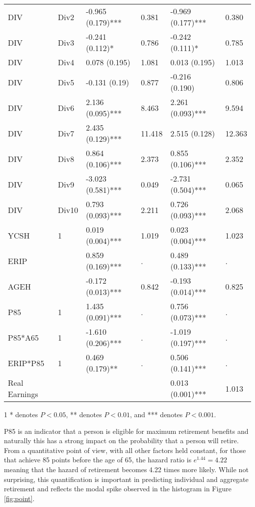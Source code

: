 \documentclass[12pt,letterpaper]{article}
\begin{document}
\begin{table}[htbp]
\begin{threeparttable}
\begin{tabular}{llL{2.5cm}L{1.5cm}L{2.5cm}L{1.5cm}}
			DIV & Div2  & -0.965 (0.179)*** & 0.381 & -0.969 (0.177)*** & 0.380 \\
			DIV & Div3  & -0.241 (0.112)* & 0.786 & -0.242 (0.111)* & 0.785 \\
			DIV & Div4  & 0.078 (0.195) & 1.081 & 0.013 (0.195) & 1.013 \\
			DIV & Div5  & -0.131 (0.19) & 0.877 & -0.216 (0.190) & 0.806 \\
			DIV & Div6  & 2.136 (0.095)*** & 8.463 & 2.261 (0.093)*** & 9.594 \\
			DIV & Div7  & 2.435 (0.129)*** & 11.418 & 2.515 (0.128) & 12.363 \\
			DIV & Div8  & 0.864 (0.106)*** & 2.373 & 0.855 (0.106)*** & 2.352 \\
			DIV & Div9  & -3.023 (0.581)*** & 0.049 & -2.731 (0.504)*** & 0.065 \\
			DIV & Div10 & 0.793 (0.093)*** & 2.211 & 0.726 (0.093)*** & 2.068 \\
			YCSH  & 1     & 0.019 (0.004)*** & 1.019 & 0.023 (0.004)*** & 1.023 \\
			ERIP  &       & 0.859 (0.169)*** & .     & 0.489 (0.133)*** & . \\
			AGEH  &       & -0.172 (0.013)*** & 0.842 & -0.193 (0.014)*** & 0.825 \\
			P85   & 1     & 1.435 (0.091)*** & .     & 0.756 (0.073)*** & . \\
			P85*A65 & 1     & -1.610 (0.206)*** & .     & -1.019 (0.197)*** & . \\
			ERIP*P85 & 1     & 0.469 (0.179)** & .     & 0.506 (0.141)*** & . \\
			Real Earnings &       &       &       & 0.013 (0.001)*** & 1.013 \\
			\bottomrule
		\end{tabular}%
		\begin{tablenotes}
			\item[1] * denotes $P<0.05$, ** denotes $P<0.01$, and *** denotes $P<0.001$.
		\end{tablenotes}
	\end{threeparttable}
	\label{tab:paraest.}%
\end{table}%
P85 is an indicator that a person is eligible for maximum retirement benefits and naturally this has a strong impact on the probability that a person will retire.  From a quantitative point of view, with all other factors held constant, for those that achieve 85 points before the age of 65, the hazard ratio is $e^{1.44} = 4.22$ meaning that the hazard of retirement becomes 4.22 times more likely.  While not surprising, this quantification is important in predicting individual and aggregate retirement and reflects the modal spike observed in the histogram in Figure \ref{fig:point}.
\end{document}
